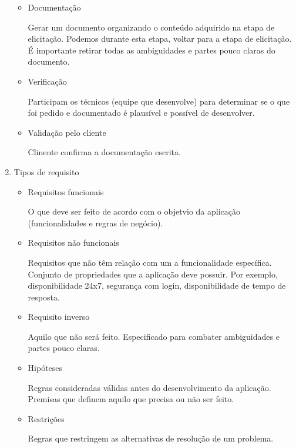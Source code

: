 \documentclass[
	12pt, %
]{fphw}
\begin{document}
\begin{doublespace}
\begin{enumerate}
\begin{itemize}
        \item Documentação
        
        Gerar um documento organizando o conteúdo adquirido na etapa de elicitação. Podemos durante esta etapa, voltar para a etapa de elicitação. É importante retirar todas as ambiguidades e partes pouco claras do documento.

        \item Verificação
        
        Participam os técnicos (equipe que desenvolve) para determinar se o que foi pedido e documentado é plausível e possível de desenvolver.

        \item Validação pelo cliente
        
        Clinente confirma a documentação escrita.

    \end{itemize}

    \item Tipos de requisito
    
    \begin{itemize}

        \item Requisitos funcionais
        
        O que deve ser feito de acordo com o objetvio da aplicação (funcionalidades e regras de negócio).

        \item Requisitos não funcionais
        
        Requisitos que não têm relação com um a funcionalidade específica. Conjunto de propriedades que a aplicação deve possuir. Por exemplo, disponibilidade 24x7, segurança com login, disponibilidade de tempo de resposta.

        \item Requisito inverso
        
        Aquilo que não será feito. Especificado para combater ambiguidades e partes pouco claras.

        \item Hipóteses
        
        Regras consideradas válidas antes do desenvolvimento da aplicação. Premisas que definem aquilo que precisa ou não ser feito.

        \item Restrições
        
        Regras que restringem as alternativas de resolução de um problema.
        

\end{itemize}
\end{enumerate}
\end{doublespace}
\end{document}
